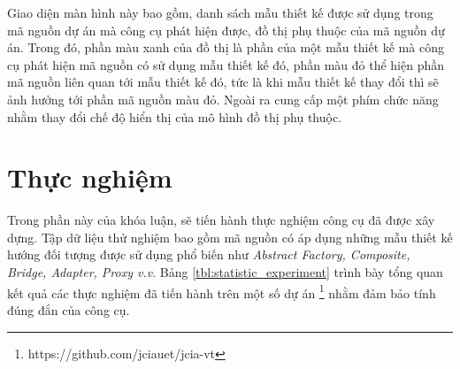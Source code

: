 \documentclass[12pt]{report}
\begin{document}
\noindent Giao diện màn hình này bao gồm, danh sách mẫu thiết kế được sử dụng trong mã nguồn dự án mà công cụ phát hiện được, đồ thị phụ thuộc của mã nguồn dự án. Trong đó, phần màu xanh của đồ thị là phần của một mẫu thiết kế mà công cụ phát hiện mã nguồn có sử dụng mẫu thiết kế đó, phần màu đỏ thể hiện phần mã nguồn liên quan tới mẫu thiết kế đó, tức là khi mẫu thiết kế thay đổi thì sẽ ảnh hưởng tới phần mã nguồn màu đỏ. Ngoài ra cung cấp một phím chức năng nhằm thay đổi chế độ hiển thị của mô hình đồ thị phụ thuộc.

\section{Thực nghiệm}
Trong phần này của khóa luận, sẽ tiến hành thực nghiệm công cụ đã được xây dựng. Tập dữ liệu thử nghiệm bao gồm mã nguồn có áp dụng những mẫu thiết kế hướng đối tượng được sử dụng phổ biến như \textit{Abstract Factory, Composite, Bridge, Adapter, Proxy v.v}. Bảng \ref{tbl:statistic_experiment} trình bày tổng quan kết quả các thực nghiệm đã tiến hành trên một số dự án \footnote{https://github.com/jciauet/jcia-vt} nhằm đảm bảo tính đúng đắn của công cụ.
\end{document}

